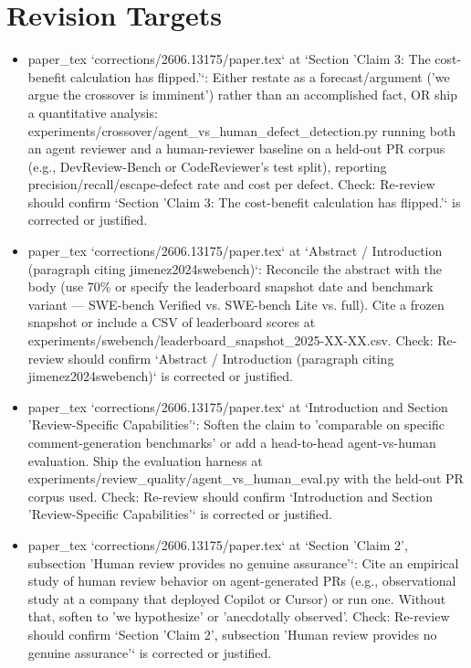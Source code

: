 \documentclass[11pt]{article}
\begin{document}
\section*{Revision Targets}
\begin{itemize}[leftmargin=*]
  \item [open] paper\_tex `corrections/2606.13175/paper.tex` at `Section 'Claim 3: The cost-benefit calculation has flipped.'`: Either restate as a forecast/argument ('we argue the crossover is imminent') rather than an accomplished fact, OR ship a quantitative analysis: experiments/crossover/agent\_vs\_human\_defect\_detection.py running both an agent reviewer and a human-reviewer baseline on a held-out PR corpus (e.g., DevReview-Bench or CodeReviewer's test split), reporting precision/recall/escape-defect rate and cost per defect. Check: Re-review should confirm `Section 'Claim 3: The cost-benefit calculation has flipped.'` is corrected or justified.
  \item [open] paper\_tex `corrections/2606.13175/paper.tex` at `Abstract / Introduction (paragraph citing jimenez2024swebench)`: Reconcile the abstract with the body (use 70\% or specify the leaderboard snapshot date and benchmark variant --- SWE-bench Verified vs. SWE-bench Lite vs. full). Cite a frozen snapshot or include a CSV of leaderboard scores at experiments/swebench/leaderboard\_snapshot\_2025-XX-XX.csv. Check: Re-review should confirm `Abstract / Introduction (paragraph citing jimenez2024swebench)` is corrected or justified.
  \item [open] paper\_tex `corrections/2606.13175/paper.tex` at `Introduction and Section 'Review-Specific Capabilities'`: Soften the claim to 'comparable on specific comment-generation benchmarks' or add a head-to-head agent-vs-human evaluation. Ship the evaluation harness at experiments/review\_quality/agent\_vs\_human\_eval.py with the held-out PR corpus used. Check: Re-review should confirm `Introduction and Section 'Review-Specific Capabilities'` is corrected or justified.
  \item [open] paper\_tex `corrections/2606.13175/paper.tex` at `Section 'Claim 2', subsection 'Human review provides no genuine assurance'`: Cite an empirical study of human review behavior on agent-generated PRs (e.g., observational study at a company that deployed Copilot or Cursor) or run one. Without that, soften to 'we hypothesize' or 'anecdotally observed'. Check: Re-review should confirm `Section 'Claim 2', subsection 'Human review provides no genuine assurance'` is corrected or justified.

\end{itemize}
\end{document}
